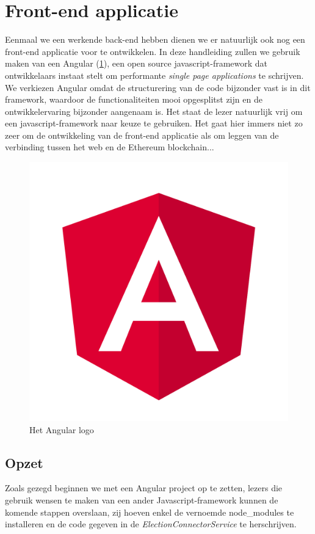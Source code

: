 	\section{Front-end applicatie}
	Eenmaal we een werkende back-end hebben dienen we er natuurlijk ook nog een front-end applicatie voor te ontwikkelen. In deze handleiding zullen we gebruik maken van een Angular (\ref{fig:angular}), een open source javascript-framework dat ontwikkelaars instaat stelt om performante \textit{single page applications} te schrijven. We verkiezen Angular omdat de structurering van de code bijzonder vast is in dit framework, waardoor de functionaliteiten mooi opgesplitst zijn en de ontwikkelervaring bijzonder aangenaam is.  Het staat de lezer natuurlijk vrij om een javascript-framework naar keuze te gebruiken. Het gaat hier  immers niet zo zeer om de ontwikkeling van de front-end applicatie als om leggen van de verbinding tussen het web en de Ethereum blockchain...
	\begin{figure}[h!]
		\centering
		\includegraphics[width=\linewidth/3]{img/angular.png}
		\caption{Het Angular logo}
		\label{fig:angular}
	\end{figure}
	\subsection{Opzet}
	Zoals gezegd beginnen we met een Angular project op te zetten, lezers die gebruik wensen te maken van een ander Javascript-framework kunnen de komende stappen overslaan, zij hoeven enkel de vernoemde node\_modules te installeren en de code gegeven in de \textit{ElectionConnectorService} te herschrijven. 
	
